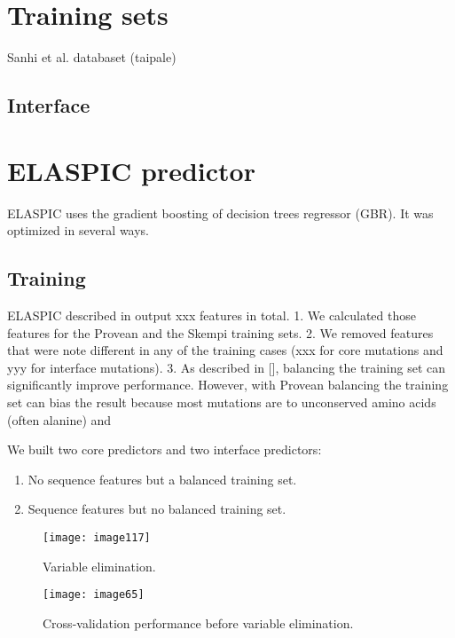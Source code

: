 


\section{Training sets}


Sanhi et al. databaset (taipale)

\subsection{Interface}


\section{ELASPIC predictor}

ELASPIC uses the gradient boosting of decision trees regressor (GBR). It was optimized in several ways.
\subsection{Training}

ELASPIC described in  output xxx features in total.
1. We calculated those features for the Provean and the Skempi training sets.
2. We removed features that were note different in any of the training cases (xxx for core mutations and yyy for interface mutations).
3. As described in [], balancing the training set can significantly improve performance. However, with Provean balancing the training set can bias the result because most mutations are to unconserved amino acids (often alanine) and



We built two core predictors and two interface predictors:

\begin{enumerate}
	\item No sequence features but a balanced training set.
	\item Sequence features but no balanced training set.
\end{enumerate}


\begin{figure}[H]
	\centering
	\texttt{[image: image117]}
	\caption{Variable elimination.}
\end{figure}

\begin{figure}[H]
	\centering
	\texttt{[image: image65]}
	\caption{Cross-validation performance before variable elimination.}
\end{figure}

